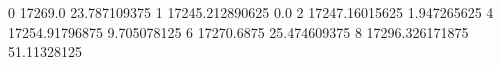 0 17269.0 23.787109375
1 17245.212890625 0.0
2 17247.16015625 1.947265625
4 17254.91796875 9.705078125
6 17270.6875 25.474609375
8 17296.326171875 51.11328125
